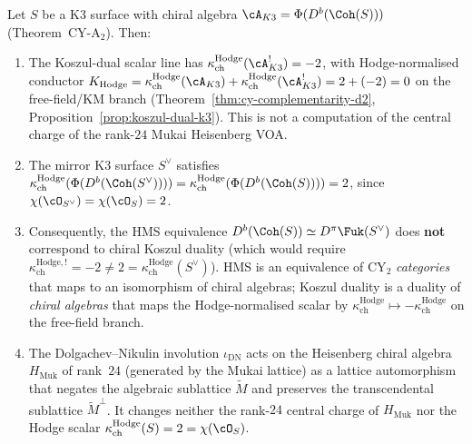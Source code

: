 \begin{theorem}
\label{thm:k3-chiral-koszul-selfdual}
Let $S$ be a K3 surface with chiral algebra $\cA_{K3} = \Phi(D^b(\Coh(S)))$ (Theorem~CY-A$_2$). Then:
\begin{enumerate}[label=\textup{(\roman*)}]
 \item The Koszul-dual scalar line has $\kappa_{\mathrm{ch}}^{\mathrm{Hodge}}(\cA_{K3}^!) = -2$, with Hodge-normalised conductor $K_{\mathrm{Hodge}} = \kappa_{\mathrm{ch}}^{\mathrm{Hodge}}(\cA_{K3}) + \kappa_{\mathrm{ch}}^{\mathrm{Hodge}}(\cA_{K3}^!) = 2 + (-2) = 0$ on the free-field/KM branch \textup{(}Theorem~\textup{\ref{thm:cy-complementarity-d2}}, Proposition~\textup{\ref{prop:koszul-dual-k3})}. This is not a computation of the central charge of the rank-$24$ Mukai Heisenberg VOA.
 \item The mirror K3 surface $S^\vee$ satisfies $\kappa_{\mathrm{ch}}^{\mathrm{Hodge}}(\Phi(D^b(\Coh(S^\vee)))) = \kappa_{\mathrm{ch}}^{\mathrm{Hodge}}(\Phi(D^b(\Coh(S)))) = 2$, since $\chi(\cO_{S^\vee}) = \chi(\cO_S) = 2$.
 \item Consequently, the HMS equivalence $D^b(\Coh(S)) \simeq D^\pi\Fuk(S^\vee)$ does \textbf{not} correspond to chiral Koszul duality \textup{(}which would require $\kappa_{\mathrm{ch}}^{\mathrm{Hodge},!} = -2 \neq 2 = \kappa_{\mathrm{ch}}^{\mathrm{Hodge}}(S^\vee)$\textup{)}. HMS is an equivalence of CY$_2$ \emph{categories} that maps to an isomorphism of chiral algebras; Koszul duality is a duality of \emph{chiral algebras} that maps the Hodge-normalised scalar by $\kappa_{\mathrm{ch}}^{\mathrm{Hodge}} \mapsto -\kappa_{\mathrm{ch}}^{\mathrm{Hodge}}$ on the free-field branch.
 \item The Dolgachev--Nikulin involution $\iota_{\mathrm{DN}}$ acts on the Heisenberg chiral algebra $H_{\mathrm{Muk}}$ of rank~$24$ \textup{(}generated by the Mukai lattice\textup{)} as a lattice automorphism that negates the algebraic sublattice $\widetilde{M}$ and preserves the transcendental sublattice $\widetilde{M}^\perp$. It changes neither the rank-$24$ central charge of $H_{\mathrm{Muk}}$ nor the Hodge scalar $\kappa_{\mathrm{ch}}^{\mathrm{Hodge}}(S) = 2 = \chi(\cO_S)$.
\end{enumerate}
\end{theorem}

